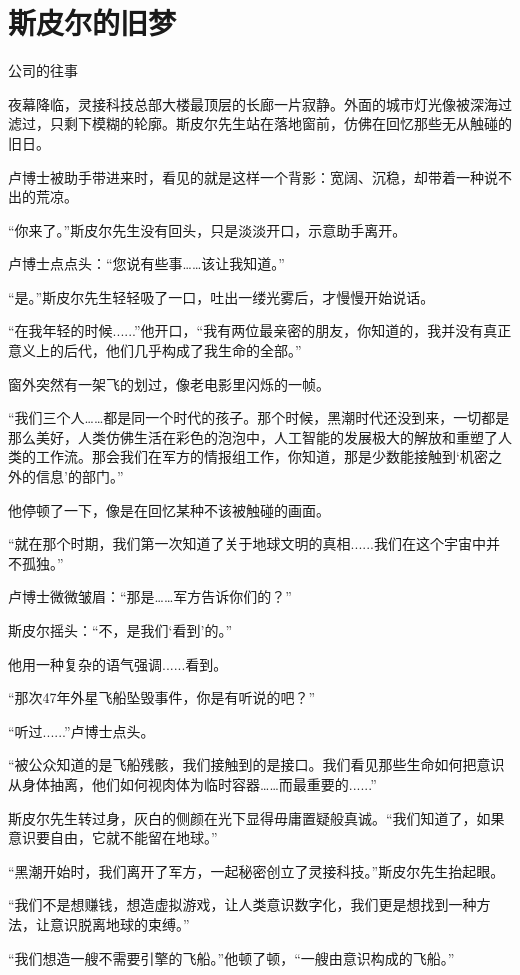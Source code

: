 \chapter{斯皮尔的旧梦}

公司的往事

夜幕降临，灵接科技总部大楼最顶层的长廊一片寂静。外面的城市灯光像被深海过滤过，只剩下模糊的轮廓。斯皮尔先生站在落地窗前，仿佛在回忆那些无从触碰的旧日。

卢博士被助手带进来时，看见的就是这样一个背影：宽阔、沉稳，却带着一种说不出的荒凉。

“你来了。”斯皮尔先生没有回头，只是淡淡开口，示意助手离开。

卢博士点点头：“您说有些事……该让我知道。”

“是。”斯皮尔先生轻轻吸了一口，吐出一缕光雾后，才慢慢开始说话。

“在我年轻的时候......”他开口，“我有两位最亲密的朋友，你知道的，我并没有真正意义上的后代，他们几乎构成了我生命的全部。”

窗外突然有一架飞的划过，像老电影里闪烁的一帧。

“我们三个人……都是同一个时代的孩子。那个时候，黑潮时代还没到来，一切都是那么美好，人类仿佛生活在彩色的泡泡中，人工智能的发展极大的解放和重塑了人类的工作流。那会我们在军方的情报组工作，你知道，那是少数能接触到‘机密之外的信息’的部门。”

他停顿了一下，像是在回忆某种不该被触碰的画面。

“就在那个时期，我们第一次知道了关于地球文明的真相......我们在这个宇宙中并不孤独。”

卢博士微微皱眉：“那是……军方告诉你们的？”

斯皮尔摇头：“不，是我们‘看到’的。”

他用一种复杂的语气强调......看到。

“那次47年外星飞船坠毁事件，你是有听说的吧？”

“听过......”卢博士点头。

“被公众知道的是飞船残骸，我们接触到的是接口。我们看见那些生命如何把意识从身体抽离，他们如何视肉体为临时容器……而最重要的......”

斯皮尔先生转过身，灰白的侧颜在光下显得毋庸置疑般真诚。“我们知道了，如果意识要自由，它就不能留在地球。”

“黑潮开始时，我们离开了军方，一起秘密创立了灵接科技。”斯皮尔先生抬起眼。

“我们不是想赚钱，想造虚拟游戏，让人类意识数字化，我们更是想找到一种方法，让意识脱离地球的束缚。”

“我们想造一艘不需要引擎的飞船。”他顿了顿，“一艘由意识构成的飞船。”

